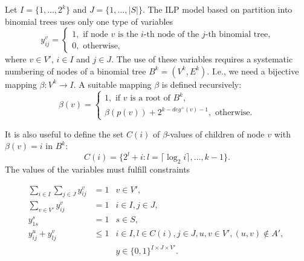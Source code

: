 Let $I=\{1,\dots,2^k\}$ and $J=\{1,\dots,|S|\}$.
The ILP model based on partition into binomial trees uses only one type of variables
$$
y_{ij}^v=\begin{cases}
1, \text{ if  node } v \text{ is the } i\text{-th node of the } j \text{-th binomial tree,}\\
0, \text{ otherwise},
\end{cases}
$$
where $v\in V'$, $i\in I$ and $j\in J$. 
The use of these variables requires a systematic numbering of nodes of a binomial tree $B^k=(V^k,E^k)$.
I.e., we need a bijective mapping $\beta: V^k \to I$.
A suitable mapping $\beta$ is defined recursively:
\begin{equation}
\label{eq:beta}
\beta(v)=\begin{cases}
1,\text{ if } v \text{ is a root of } B^k,\\
\beta(p(v)) + 2^{k-deg^+(v)-1}, \text{ otherwise}.
\end{cases}
\end{equation}

It is also useful to define the set $C(i)$ of $\beta$-values of children of node $v$ with $\beta(v)=i$ in $B^k$:
\begin{equation}
C(i)=\{2^l+i:l=\lceil\log_2 i\rceil,\dots,k-1\}.
\end{equation}
The values of the variables must fulfill constraints

\begin{subequations}\label{mod:partition}
\begin{align}
\label{mod:part:nodeBelongs} \sum\limits_{i\in I}\sum\limits_{j\in J}y^v_{ij} & = 1 & v\in V',\\
\label{mod:part:treeHasIJ} \sum\limits_{v\in V'}y^v_{ij} & = 1 & i\in I,j\in J,\\
\label{mod:part:source1} y_{1s}^s & = 1  & s\in S,\\
\label{mod:part:followArcs} y^u_{ij}+y^v_{lj} &\leq 1 & i\in I,l\in C(i), j\in J, u,v\in V',(u,v)\not\in A',\\
\label{mod:part:dim}&&y \in \{0,1\}^{I\times J\times V'}.
\end{align}~
\end{subequations}

